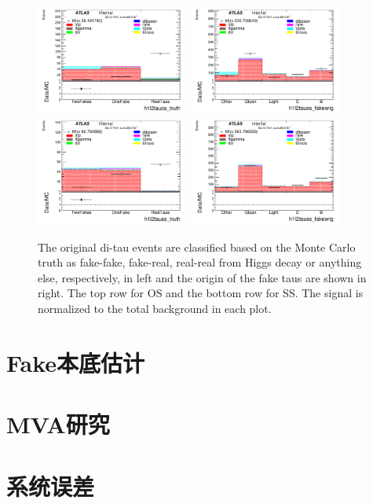 \begin{figure}[htbp]
\centering
\begin{center}
  \includegraphics[width=0.45\textwidth, keepaspectratio]{fig/OneLepTwoTaus/Plots_h1l2tauos_truth_signal.pdf}
  \includegraphics[width=0.45\textwidth, keepaspectratio]{fig/OneLepTwoTaus/Plots_h1l2tauos_fakeorig_signal.pdf}
  \includegraphics[width=0.45\textwidth, keepaspectratio]{fig/OneLepTwoTaus/Plots_h1l2tauss_truth_signal.pdf}
  \includegraphics[width=0.45\textwidth, keepaspectratio]{fig/OneLepTwoTaus/Plots_h1l2tauss_fakeorig_signal.pdf}
\end{center}
\caption{The original di-tau events are classified based on the Monte Carlo truth as fake-fake, fake-real, real-real from Higgs decay or 
anything else, respectively, in left and the origin of the fake taus are shown in right. The top row for OS and the bottom row for SS. The signal is normalized to the total background in each plot.}
\label{Fig:1l2tau.truth}
\end{figure}

\section{Fake本底估计}

\section{MVA研究}

\section{系统误差}\label{sec:1l2tau_sys}
